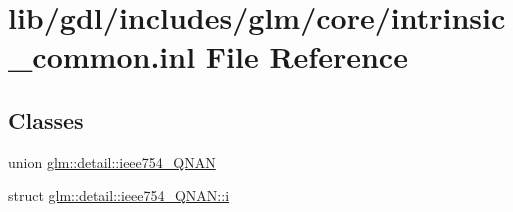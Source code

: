 \hypertarget{intrinsic__common_8inl}{}\section{lib/gdl/includes/glm/core/intrinsic\+\_\+common.inl File Reference}
\label{intrinsic__common_8inl}
\subsection*{Classes}
\begin{DoxyCompactItemize}
\item 
union \hyperlink{unionglm_1_1detail_1_1ieee754___q_n_a_n}{glm\+::detail\+::ieee754\+\_\+\+Q\+N\+A\+N}
\item 
struct \hyperlink{structglm_1_1detail_1_1ieee754___q_n_a_n_1_1i}{glm\+::detail\+::ieee754\+\_\+\+Q\+N\+A\+N\+::i}
\end{DoxyCompactItemize}
